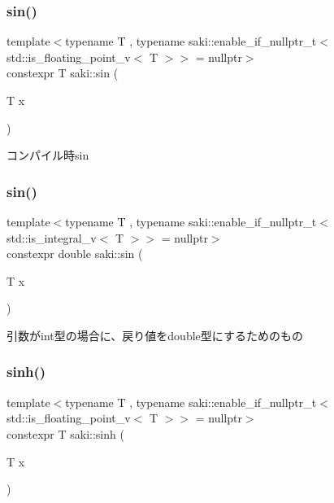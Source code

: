 \subsubsection{\texorpdfstring{sin()}{sin()}\hspace{0.1cm}{\footnotesize\ttfamily [1/2]}}
{\footnotesize\ttfamily template$<$typename T , typename saki\+::enable\+\_\+if\+\_\+nullptr\+\_\+t$<$ std\+::is\+\_\+floating\+\_\+point\+\_\+v$<$ T $>$$>$  = nullptr$>$ \\
constexpr T saki\+::sin (\begin{DoxyParamCaption}\item[{T}]{x }\end{DoxyParamCaption})}



コンパイル時sin 

\mbox{\label{namespacesaki_a9fd77d1e52189e28f4a5d069891501cf}} 
\subsubsection{\texorpdfstring{sin()}{sin()}\hspace{0.1cm}{\footnotesize\ttfamily [2/2]}}
{\footnotesize\ttfamily template$<$typename T , typename saki\+::enable\+\_\+if\+\_\+nullptr\+\_\+t$<$ std\+::is\+\_\+integral\+\_\+v$<$ T $>$$>$  = nullptr$>$ \\
constexpr double saki\+::sin (\begin{DoxyParamCaption}\item[{T}]{x }\end{DoxyParamCaption})}



引数がint型の場合に、戻り値をdouble型にするためのもの 

\mbox{\label{namespacesaki_abe1ef6db83d59a5eb2daac9bff09d312}} 
\subsubsection{\texorpdfstring{sinh()}{sinh()}\hspace{0.1cm}{\footnotesize\ttfamily [1/2]}}
{\footnotesize\ttfamily template$<$typename T , typename saki\+::enable\+\_\+if\+\_\+nullptr\+\_\+t$<$ std\+::is\+\_\+floating\+\_\+point\+\_\+v$<$ T $>$$>$  = nullptr$>$ \\
constexpr T saki\+::sinh (\begin{DoxyParamCaption}\item[{T}]{x }\end{DoxyParamCaption})}



